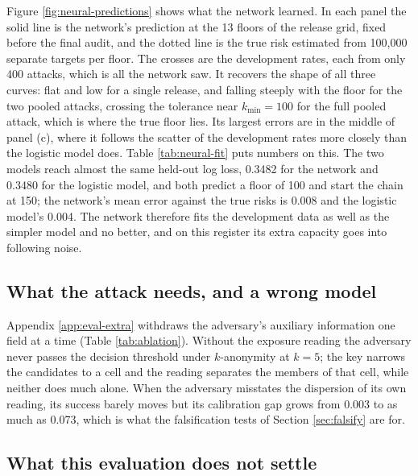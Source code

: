 \documentclass[11pt,a4paper]{article}
\theoremstyle{plain}
\theoremstyle{definition}
\theoremstyle{definition}
\theoremstyle{plain}
\begin{document}




Figure \ref{fig:neural-predictions} shows what the network learned. In each panel
the solid line is the network's prediction at the 13 floors of the release grid,
fixed before the final audit, and the dotted line is the true risk estimated from
100{,}000 separate targets per floor. The crosses are the development rates, each
from only 400 attacks, which is all the network saw. It recovers the shape of all
three curves: flat and low for a single release, and falling steeply with the floor
for the two pooled attacks, crossing the tolerance near $k_{\min} = 100$ for the
full pooled attack, which is where the true floor lies. Its largest errors are in
the middle of panel (c), where it follows the scatter of the development rates
more closely than the logistic model does. Table \ref{tab:neural-fit} puts numbers
on this. The two models reach almost the same held-out log loss, 0.3482 for the
network and 0.3480 for the logistic model, and both predict a floor of 100 and
start the chain at 150; the network's mean error against the true risks is 0.008
and the logistic model's 0.004. The network therefore fits the development data as
well as the simpler model and no better, and on this register its extra capacity
goes into following noise.




\subsection{What the attack needs, and a wrong model}\label{sec:eval-cost}

Appendix \ref{app:eval-extra} withdraws the adversary's auxiliary information one
field at a time (Table \ref{tab:ablation}). Without the exposure reading the
adversary never passes the decision threshold under $k$-anonymity at $k=5$; the
key narrows the candidates to a cell and the reading separates the members of
that cell, while neither does much alone. When the adversary misstates the
dispersion of its own reading, its success barely moves but its calibration gap
grows from 0.003 to as much as 0.073, which is what the falsification tests of
Section \ref{sec:falsify} are for.

\subsection{What this evaluation does not settle}\label{sec:eval-limits}
\end{document}
